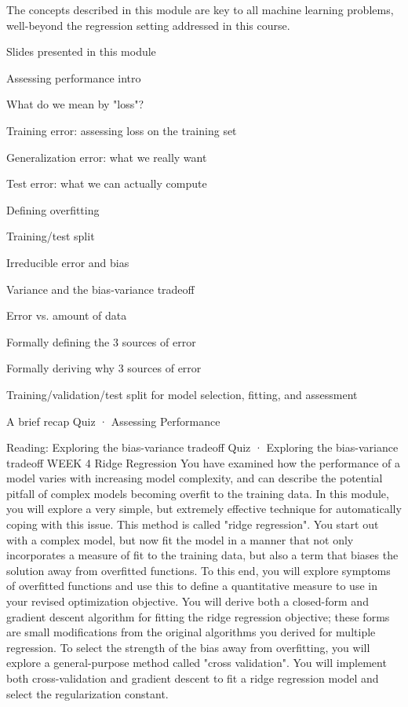 The concepts described in this module are key to all machine learning problems, well-beyond the regression setting addressed in this course.

\item Slides presented in this module
\item Assessing performance intro
\item What do we mean by "loss"?
\item Training error: assessing loss on the training set
\item Generalization error: what we really want
\item Test error: what we can actually compute
\item Defining overfitting
\item Training/test split
\item Irreducible error and bias
\item Variance and the bias-variance tradeoff
\item Error vs. amount of data
\item Formally defining the 3 sources of error
\item Formally deriving why 3 sources of error
\item Training/validation/test split for model selection, fitting, and assessment
\item A brief recap
Quiz · Assessing Performance
\item Reading: Exploring the bias-variance tradeoff
Quiz · Exploring the bias-variance tradeoff
WEEK 4
Ridge Regression
You have examined how the performance of a model varies with increasing model complexity, and can describe the potential pitfall of complex models becoming overfit to the training data. In this module, you will explore a very simple, but extremely effective technique for automatically coping with this issue. This method is called "ridge regression". You start out with a complex model, but now fit the model in a manner that not only incorporates a measure of fit to the training data, but also a term that biases the solution away from overfitted functions. To this end, you will explore symptoms of overfitted functions and use this to define a quantitative measure to use in your revised optimization objective. You will derive both a closed-form and gradient descent algorithm for fitting the ridge regression objective; these forms are small modifications from the original algorithms you derived for multiple regression. To select the strength of the bias away from overfitting, you will explore a general-purpose method called "cross validation".
You will implement both cross-validation and gradient descent to fit a ridge regression model and select the regularization constant.

